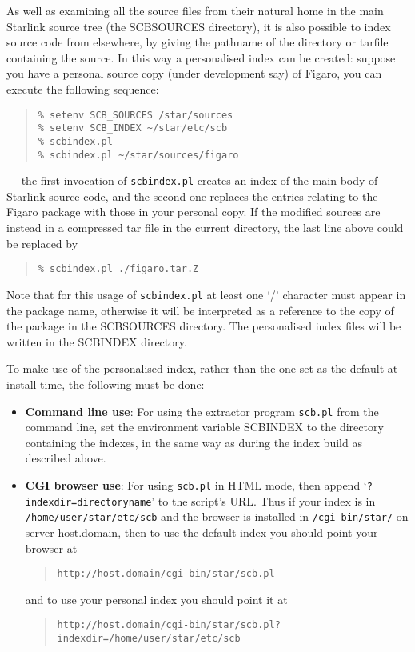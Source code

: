 \documentclass[twoside,11pt]{article}
\renewcommand{\_}{\texttt{\symbol{95}}}
\begin{document}
As well as examining all the source files from their natural home
in the main Starlink source tree (the SCB\_SOURCES directory),
it is also possible to index source code from elsewhere, 
by giving the pathname of the directory
or tarfile containing the source.
In this way a personalised index can be created: 
suppose you have a personal source copy (under development say) of 
Figaro, you can execute the following sequence:
\begin{quote}
\begin{verbatim}
% setenv SCB_SOURCES /star/sources
% setenv SCB_INDEX ~/star/etc/scb
% scbindex.pl
% scbindex.pl ~/star/sources/figaro
\end{verbatim}
\end{quote}
--- the first invocation of {\tt scbindex.pl} 
creates an index of the main body
of Starlink source code, and the second one
replaces the entries relating to the Figaro package 
with those in your personal copy.
If the modified sources are instead in a compressed tar file in the current
directory, the last line above could be replaced by
\begin{quote}
\begin{verbatim}
% scbindex.pl ./figaro.tar.Z
\end{verbatim}
\end{quote}
Note that for this usage of {\tt scbindex.pl} at least one `/' character
must appear in the package name, otherwise it will be interpreted
as a reference to the copy of the package in the SCB\_SOURCES directory.
The personalised index files will be written in the SCB\_INDEX directory.

To make use of the personalised index, rather than the one set as
the default at install time, the following must be done:
\begin{itemize}
\item {\bf Command line use}:
For using the extractor program {\tt scb.pl} from the command line, 
set the environment variable SCB\_INDEX to the directory containing
the indexes, in the same way as during the index build as described
above.
\item {\bf CGI browser use}:
For using {\tt scb.pl} in HTML mode, then append 
`{\tt ?indexdir=directoryname}' to the script's URL.
Thus if your index is in {\tt /home/user/star/etc/scb}
and the browser is installed in {\tt /cgi-bin/star/} on server
host.domain, then to use the default index you should point
your browser at
\begin{quote}
\begin{verbatim}
http://host.domain/cgi-bin/star/scb.pl
\end{verbatim}
\end{quote}
and to use your personal index you should point it at
\begin{quote}
\begin{verbatim}
http://host.domain/cgi-bin/star/scb.pl?indexdir=/home/user/star/etc/scb
\end{verbatim}
\end{quote}
\end{itemize}
\end{document}
